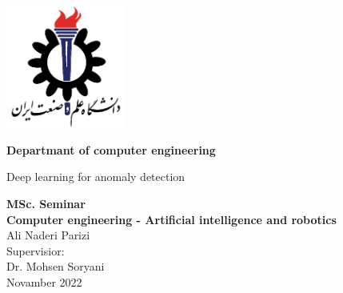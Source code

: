 \documentclass[12pt,a4paper]{report}
\begin{document}
\begin{latin}

\newpage
\thispagestyle{empty}

	\vspace*{25mm}
	\centerline{\includegraphics[height=4cm]{./images/logos/iust.png}}

	\begin{center}
	\textbf{
Departmant of computer engineering
	}
	\\[1cm]
	\baselineskip=2cm
	{\titr
	\begin{Huge}
	Deep learning for anomaly detection\\[1cm]
	\end{Huge}}
	{\Large 
		\textbf{
			MSc. Seminar \\
Computer engineering - Artificial intelligence and robotics
		} \\[1cm]
	}
	{
	{\Large  Ali Naderi Parizi}
	\\[.5cm]
	{\Large  Supervisior:}
	\\[.3cm]
	{\Large Dr.  Mohsen Soryani}
	\\[.6cm]
	}
Novamber 2022
	\end{center}

\end{latin}
\end{document}
